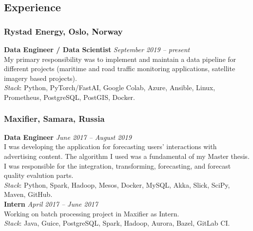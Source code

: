 \subsection*{Experience}
    \subsubsection*{Rystad Energy, Oslo, Norway}
    \textbf{Data Engineer / Data Scientist} \hfill \textit{September 2019 -- present} \\
    My primary responsibility was to implement and maintain a data pipeline for different projects 
    (maritime and road traffic monitoring applications, satellite imagery based projects). \\
    \textit{Stack}: Python, PyTorch/FastAI, Google Colab, Azure, Ansible, Linux, Prometheus, PostgreSQL, PostGIS, Docker.
    \subsubsection*{Maxifier, Samara, Russia}
    \textbf{Data Engineer} \hfill \textit{June 2017 -- August 2019} \\
    I was developing the application for forecasting users' interactions with advertising content.
    The algorithm I used was a fundamental of my Master thesis.
    I was responsible for the integration, transforming, forecasting, and forecast quality evalution parts.  \\
    \textit{Stack}: Python, Spark, Hadoop, Mesos, Docker, MySQL, Akka, Slick, SciPy, Maven, GitHub. \\
    \textbf{Intern} \hfill \textit{April 2017 -- June 2017} \\
    Working on batch processing project in Maxifier as Intern. \\
    \textit{Stack}: Java, Guice, PostgreSQL, Spark, Hadoop, Aurora, Bazel, GitLab CI.

